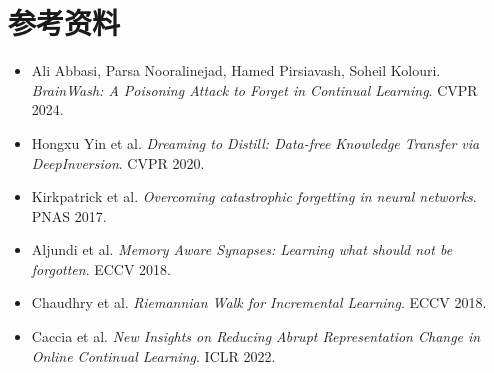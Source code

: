 \documentclass[11pt]{article}
\begin{document}
\section*{参考资料}

\begin{itemize}
  \item Ali Abbasi, Parsa Nooralinejad, Hamed Pirsiavash, Soheil Kolouri.
  \textit{BrainWash: A Poisoning Attack to Forget in Continual Learning}.
  CVPR 2024.
  \item Hongxu Yin et al.
  \textit{Dreaming to Distill: Data-free Knowledge Transfer via DeepInversion}.
  CVPR 2020.
  \item Kirkpatrick et al.
  \textit{Overcoming catastrophic forgetting in neural networks}.
  PNAS 2017.
  \item Aljundi et al.
  \textit{Memory Aware Synapses: Learning what should not be forgotten}.
  ECCV 2018.
  \item Chaudhry et al.
  \textit{Riemannian Walk for Incremental Learning}.
  ECCV 2018.
  \item Caccia et al.
  \textit{New Insights on Reducing Abrupt Representation Change in Online Continual Learning}.
  ICLR 2022.
\end{itemize}
\end{document}
